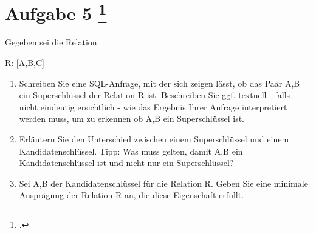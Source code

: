 \documentclass{lehramt-informatik-aufgabe}
\begin{document}
\section{Aufgabe 5
\footcite{66116:2020:03}}

Gegeben sei die Relation

R: {[A,B,C]}

\begin{enumerate}
\item Schreiben Sie eine SQL-Anfrage, mit der sich zeigen lässt, ob das
Paar A,B ein Superschlüssel der Relation R ist. Beschreiben Sie ggf.
textuell - falls nicht eindeutig ersichtlich - wie das Ergebnis Ihrer
Anfrage interpretiert werden muss, um zu erkennen ob A,B ein
Superschlüssel ist.

\begin{liAntwort}

\end{liAntwort}

\item Erläutern Sie den Unterschied zwischen einem Superschlüssel und
einem Kandidatenschlüssel. Tipp: Was muss gelten, damit A,B ein
Kandidatenschlüssel ist und nicht nur ein Superschlüssel?

\begin{liAntwort}

\end{liAntwort}

\item Sei A,B der Kandidatenschlüssel für die Relation R. Geben Sie eine
minimale Ausprägung der Relation R an, die diese Eigenschaft erfüllt.

\begin{liAntwort}

\end{liAntwort}

\end{enumerate}
\end{document}

